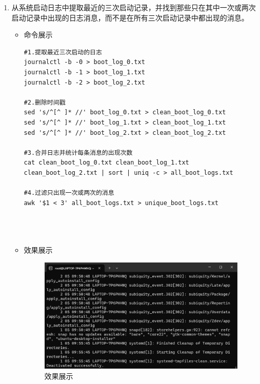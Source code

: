 \documentclass[UTF8]{ctexart}
\begin{document}
\begin{enumerate}
  \item 从系统启动日志中提取最近的三次启动记录，并找到那些只在其中一次或两次启动记录中出现的日志消息，而不是在所有三次启动记录中都出现的消息。
  \begin{itemize}
  \item 命令展示
  \begin{verbatim}
#1.提取最近三次启动的日志
journalctl -b -0 > boot_log_0.txt
journalctl -b -1 > boot_log_1.txt
journalctl -b -2 > boot_log_2.txt

#2.删除时间戳
sed 's/^[^ ]* //' boot_log_0.txt > clean_boot_log_0.txt
sed 's/^[^ ]* //' boot_log_1.txt > clean_boot_log_1.txt
sed 's/^[^ ]* //' boot_log_2.txt > clean_boot_log_2.txt

#3.合并日志并统计每条消息的出现次数
cat clean_boot_log_0.txt clean_boot_log_1.txt clean_boot_log_2.txt | sort | uniq -c > all_boot_logs.txt

#4.过滤只出现一次或两次的消息
awk '$1 < 3' all_boot_logs.txt > unique_boot_logs.txt


    
  \end{verbatim}

  \item 效果展示
  \begin{figure}[H]
    \centering
    \includegraphics[width=\textwidth]{33} %
    \caption{效果展示}
  
  \end{figure}
\end{itemize}
\end{enumerate}
\end{document}
